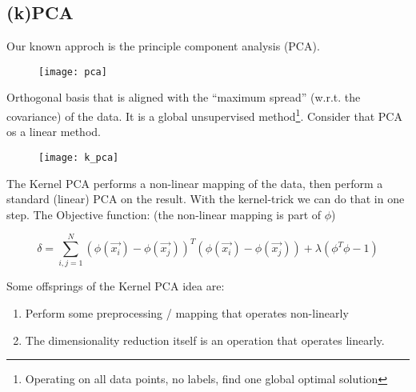 
\subsection*{(k)PCA}

Our known approch is the principle component analysis (PCA).

\begin{figure}[H]
	\centering
	\texttt{[image: pca]}
\end{figure}

Orthogonal basis that is aligned with the ``maximum spread'' (w.r.t. the covariance) of the data. It is a global unsupervised method\footnote{Operating on all data points, no labels, find one global optimal solution}. Consider that PCA os a linear method.

\begin{figure}[H]
	\centering
	\texttt{[image: k\_pca]}
\end{figure}

The Kernel PCA performs a non-linear mapping of the data, then perform a standard (linear) PCA on the result. With the kernel-trick we can do that in one step. The Objective function: (the non-linear mapping is part of $\phi$)

\begin{equation*}
    \delta = \sum_{i,j=1}^{N} (\phi(\vec{x_i}) - \phi(\vec{x_j}))^T (\phi(\vec{x_i}) - \phi(\vec{x_j})) + \lambda (\phi^T\phi-1)
\end{equation*}

Some offsprings of the Kernel PCA idea are:
\begin{enumerate}
    \item Perform some preprocessing / mapping that operates non-linearly
    \item The dimensionality reduction itself is an operation that operates linearly.
\end{enumerate}
